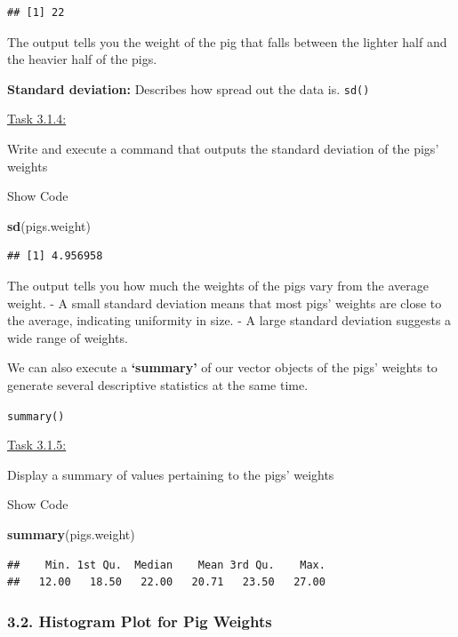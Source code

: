 \documentclass[
]{article}
\newenvironment{Shaded}{\begin{snugshade}}{\end{snugshade}}
\newcommand{\FunctionTok}[1]{\textcolor[rgb]{0.13,0.29,0.53}{\textbf{#1}}}
\newcommand{\NormalTok}[1]{#1}
\begin{document}
\begin{verbatim}
## [1] 22
\end{verbatim}

The output tells you the weight of the pig that falls between the
lighter half and the heavier half of the pigs.

\textbf{Standard deviation:} Describes how spread out the data is.
\texttt{sd()}

\ul{Task 3.1.4:}

Write and execute a command that outputs the standard deviation of the
pigs' weights

Show Code

\begin{Shaded}
\begin{Highlighting}[]
\FunctionTok{sd}\NormalTok{(pigs.weight)}
\end{Highlighting}
\end{Shaded}

\begin{verbatim}
## [1] 4.956958
\end{verbatim}

The output tells you how much the weights of the pigs vary from the
average weight. - A small standard deviation means that most pigs'
weights are close to the average, indicating uniformity in size. - A
large standard deviation suggests a wide range of weights.

We can also execute a \textbf{`summary'} of our vector objects of the
pigs' weights to generate several descriptive statistics at the same
time.

\texttt{summary()}

\ul{Task 3.1.5:}

Display a summary of values pertaining to the pigs' weights

Show Code

\begin{Shaded}
\begin{Highlighting}[]
\FunctionTok{summary}\NormalTok{(pigs.weight)}
\end{Highlighting}
\end{Shaded}

\begin{verbatim}
##    Min. 1st Qu.  Median    Mean 3rd Qu.    Max. 
##   12.00   18.50   22.00   20.71   23.50   27.00
\end{verbatim}

\hypertarget{histogram-plot-for-pig-weights}{%
\subsubsection{3.2. Histogram Plot for Pig
Weights}\label{histogram-plot-for-pig-weights}}
\end{document}
